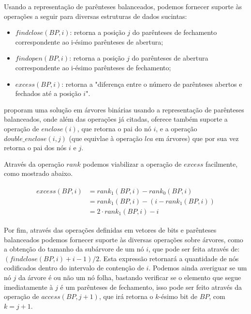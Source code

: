 Usando a representação de parênteses balanceados, podemos fornecer suporte às operações a seguir para diversas estruturas de dados sucintas:
\begin{itemize}
    \item $findclose(BP,i)$: retorna a posição $j$ do parênteses de fechamento correspondente ao i-ésimo parênteses de abertura;
    \item $findopen(BP, i)$: retorna a posição $j$ do parênteses de abertura correspondente ao i-ésimo parênteses de fechamento;
    \item $excess(BP, i)$: retorna a "diferença entre o número de parênteses abertos e fechados até a posição $i$".  \cite[tradução nossa]{paper-succint-representation-of-balanced-parentheses}
\end{itemize}

\citet{paper-succint-representation-of-balanced-parentheses} proporam uma solução em árvores binárias usando a representação de parênteses balanceados, onde  além das operações já citadas, oferece também suporte a operação de $enclose(i)$, que retorna o pai do nó $i$, 
e a operação $double\_enclose(i,j)$ (que equivlae à operação $lca$ em árvores) que por sua vez retorna o pai dos nós $i$ e $j$. 

Através da operação  $rank$ podemos viabilizar a operação de $excess$ facilmente, como mostrado abaixo.

\begin{eqnarray*}
    \begin{split}
        excess(BP,i) &= rank_1(BP,i) - rank_0(BP,i) \\
        &  = rank_1(BP,i) - (i - rank_1(BP,i)) \\
        &  = 2 \cdot rank_1(BP,i) - i 
    \end{split}
\end{eqnarray*}

Por fim, através das operações definidas em vetores de bits e parênteses balanceados podemos fornecer suporte às diversas operações sobre árvores, como a obtenção do tamanho da subárvore de um
nó $i$, que pode ser feita através de: $(findclose(BP,i)+i-1)/2$. Esta expressão retornará a quantidade de nós codificados dentro do intervalo de contenção de $i$. Podemos ainda averiguar se um
nó $j$ da árvore é ou não um nó folha, bastando verificar se o elemento que segue imediatamente à $j$ é um parênteses de fechamento, isso pode ser feito através da operação de $access(BP,j+1)$,
que irá retorna o $k$-ésimo bit de $BP$, com $k=j+1$.

